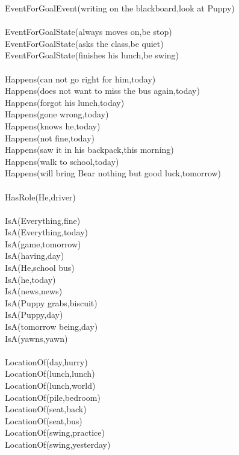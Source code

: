 \begin{multicols}{2}
\begin{footnotesize}
EventForGoalEvent(writing on the blackboard,look at Puppy) \\
~\\
EventForGoalState(always moves on,be stop) \\
EventForGoalState(asks the class,be quiet) \\
EventForGoalState(finishes his lunch,be swing) \\
~\\
Happens(can not go right for him,today) \\
Happens(does not want to miss the bus again,today) \\
Happens(forgot his lunch,today) \\
Happens(gone wrong,today) \\
Happens(knows he,today) \\
Happens(not fine,today) \\
Happens(saw it in his backpack,this morning) \\
Happens(walk to school,today) \\
Happens(will bring Bear nothing but good luck,tomorrow) \\
~\\
HasRole(He,driver) \\
~\\
IsA(Everything,fine) \\
IsA(Everything,today) \\
IsA(game,tomorrow) \\
IsA(having,day) \\
IsA(He,school bus) \\
IsA(he,today) \\
IsA(news,news) \\
IsA(Puppy grabs,biscuit) \\
IsA(Puppy,day) \\
IsA(tomorrow being,day) \\
IsA(yawns,yawn) \\
~\\
LocationOf(day,hurry) \\
LocationOf(lunch,lunch) \\
LocationOf(lunch,world) \\
LocationOf(pile,bedroom) \\
LocationOf(seat,back) \\
LocationOf(seat,bus) \\
LocationOf(swing,practice) \\
LocationOf(swing,yesterday) \\
~\\

\end{footnotesize}
\end{multicols}
